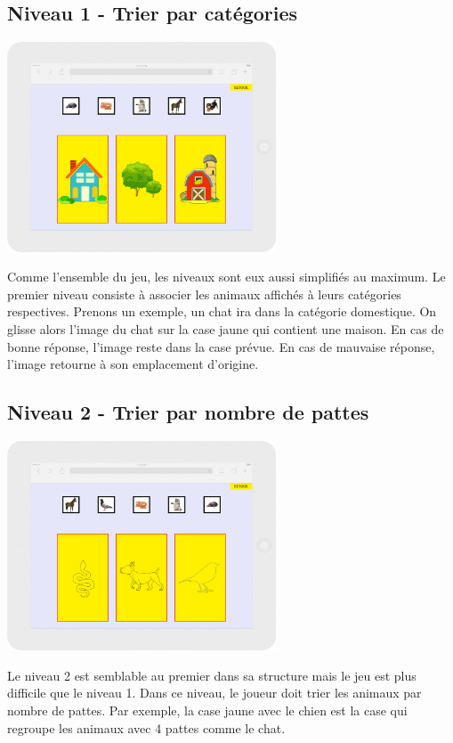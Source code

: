 \documentclass{article}
\begin{document}
\subsection{Niveau 1 - Trier par cat\'egories}
\vspace{0.5cm}
\begin{center}
\includegraphics[width=0.6\textwidth]{page2}
\end{center}
\vspace{0.5cm}
\hspace*{0.6cm}Comme l'ensemble du jeu, les niveaux sont eux aussi simplifi\'es au maximum.
Le premier niveau consiste \`a associer les animaux affich\'es \`a leurs cat\'egories respectives. Prenons un exemple, un chat ira dans la cat\'egorie domestique. On glisse alors l'image du chat sur la case jaune qui contient une maison. En cas de bonne r\'eponse, l'image reste dans la case pr\'evue. En cas de mauvaise r\'eponse, l'image retourne \`a son emplacement d'origine.
\subsection{Niveau 2 - Trier par nombre de pattes}
\vspace{0.5cm}
\begin{center}
\includegraphics[width=0.6\textwidth]{page3}
\end{center}
\vspace{0.5cm}
\hspace*{0.6cm}Le niveau 2 est semblable au premier dans sa structure mais le jeu est plus difficile que le niveau 1. Dans ce niveau, le joueur doit trier les animaux par nombre de pattes. Par exemple, la case jaune avec le chien est la case qui regroupe les animaux avec 4 pattes comme le chat.
\end{document}
